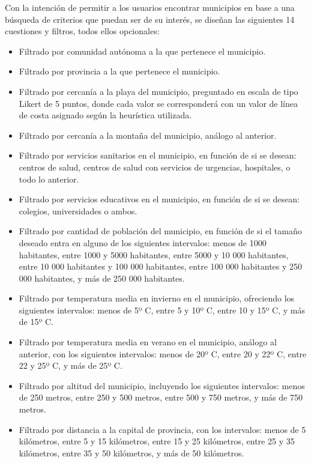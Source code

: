 Con la intención de permitir a los usuarios encontrar municipios en base a una búsqueda de criterios que puedan ser de su interés, se diseñan las siguientes 14 cuestiones y filtros, todos ellos opcionales:

\begin{itemize}
    \item Filtrado por comunidad autónoma a la que pertenece el municipio.
    \item Filtrado por provincia a la que pertenece el municipio.
    \item Filtrado por cercanía a la playa del municipio, preguntado en escala de tipo Likert de 5 puntos, donde cada valor se corresponderá con un valor de línea de costa asignado según la heurística utilizada.
    \item Filtrado por cercanía a la montaña del municipio, análogo al anterior.
    \item Filtrado por servicios sanitarios en el municipio, en función de si se desean: centros de salud, centros de salud con servicios de urgencias, hospitales, o todo lo anterior.
    \item Filtrado por servicios educativos en el municipio, en función de si se desean: colegios, universidades o ambos.
    \item Filtrado por cantidad de población del municipio, en función de si el tamaño deseado entra en alguno de los siguientes intervalos: menos de 1000 habitantes, entre 1000 y 5000 habitantes, entre 5000 y 10 000 habitantes, entre 10 000 habitantes y 100 000 habitantes, entre 100 000 habitantes y 250 000 habitantes, y más de 250 000 habitantes.
    \item Filtrado por temperatura media en invierno en el municipio, ofreciendo los siguientes intervalos: menos de 5º C, entre 5 y 10º C, entre 10 y 15º C, y más de 15º C.
    \item Filtrado por temperatura media en verano en el municipio, análogo al anterior, con los siguientes intervalos: menos de 20º C, entre 20 y 22º C, entre 22 y 25º C, y más de 25º C.
    \item Filtrado por altitud del municipio, incluyendo los siguientes intervalos: menos de 250 metros, entre 250 y 500 metros, entre 500 y 750 metros, y más de 750 metros.
    \item Filtrado por distancia a la capital de provincia, con los intervalos: menos de 5 kilómetros, entre 5 y 15 kilómetros, entre 15 y 25 kilómetros, entre 25 y 35 kilómetros, entre 35 y 50 kilómetros, y más de 50 kilómetros.

\end{itemize}
